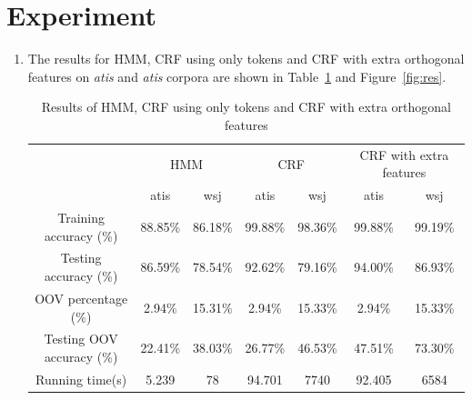 \documentclass[winfonts,UTF8]{article}
\begin{document}
\section{Experiment}
\begin{enumerate}
\item
The results for HMM, CRF using only tokens and CRF with extra orthogonal features on \emph{atis} and \emph{atis} corpora are shown in Table~\ref{tab:res} and Figure~\ref{fig:res}.

\begin{table}[!htbp]
\centering
{
\begin{tabular}{c|c|c|c|c|c|c}
\hline 
 & \multicolumn{2}{|c|}{HMM} &  \multicolumn{2}{|c|}{CRF} & \multicolumn{2}{|c}{CRF with extra features} \\ 
 \cline{2-7}
 & atis & wsj & atis & wsj & atis & wsj \\ 
\hline 
Training accuracy (\%) & 88.85\% & 86.18\% & 99.88\% & 98.36\% & 99.88\% & 99.19\% \\ 
\hline 
Testing accuracy (\%) & 86.59\% & 78.54\% & 92.62\% & 79.16\% & 94.00\% & 86.93\% \\
\hline 
OOV percentage (\%) & 2.94\% & 15.31\% & 2.94\% & 15.33\% & 2.94\% & 15.33\% \\
\hline
Testing OOV accuracy (\%) & 22.41\% & 38.03\% & 26.77\% & 46.53\% & 47.51\% & 73.30\%\\
\hline
Running time(s) & 5.239 & 78 & 94.701 & 7740 & 92.405 & 6584\\
\hline 
\end{tabular} 
}
\caption{Results of HMM, CRF using only tokens and CRF with extra orthogonal features}
\label{tab:res}
\end{table}



\end{enumerate}
\end{document}

